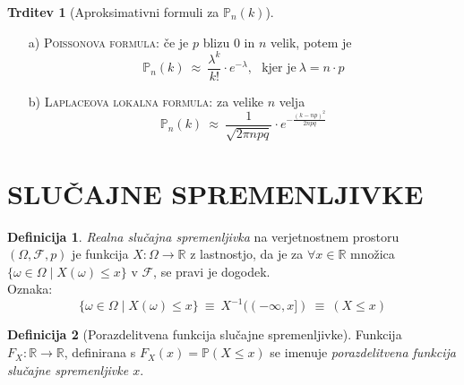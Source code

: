 \documentclass[11pt]{article}
\theoremstyle{definition}
\newtheorem{definicija}{Definicija}[section]
\theoremstyle{definition}
\newtheorem{trditev}{Trditev}[section]
\theoremstyle{definition}
\begin{document}
\begin{trditev}[Aproksimativni formuli za $\mathbb{P}_n(k)$]

~\\
\begin{enumerate}
	\item[a)] \textsc{Poissonova formula}: če je $p$ blizu $0$ in $n$ velik, potem je
	$$\mathbb{P}_n(k) ~\approx~ \frac{\lambda^k}{k!} \cdot e^{-\lambda}, ~~~\text{kjer je}~ \lambda = n \cdot p$$
	\item[b)] \textsc{Laplaceova lokalna formula}: za velike $n$ velja
	$$\mathbb{P}_n(k) ~\approx~ \frac{1}{\sqrt{2 \pi n p q}} \cdot e^{-\frac{(k-np)^2}{2npq}}$$
\end{enumerate}

\end{trditev}
\vspace{0.5cm}


\pagebreak


\section{SLUČAJNE SPREMENLJIVKE}
\vspace{0.5cm}

\begin{definicija}

\textit{Realna slučajna spremenljivka} na verjetnostnem prostoru $(\Omega, \mathcal{F}, p)$ je funkcija $X: \Omega \rightarrow \mathbb{R}$ z lastnostjo, da je za $\forall x \in \mathbb{R}$ množica $\{ \omega \in \Omega \mid X(\omega) \leq x \}$ v $\mathcal{F}$, se pravi je dogodek.\\

\noindent Oznaka:
$$\{ \omega \in \Omega \mid X(\omega) \leq x \} ~\equiv~ X^{-1}((-\infty, x]) ~\equiv~ (X \leq x)$$

\end{definicija}
\vspace{0.5cm}

\begin{definicija}[Porazdelitvena funkcija slučajne spremenljivke]

Funkcija $F_X: \mathbb{R} \rightarrow \mathbb{R}$, definirana s $F_X(x) = \mathbb{P}(X \leq x)$ se imenuje \textit{porazdelitvena funkcija slučajne spremenljivke $x$}.

\end{definicija}
\vspace{0.5cm}
\end{document}
